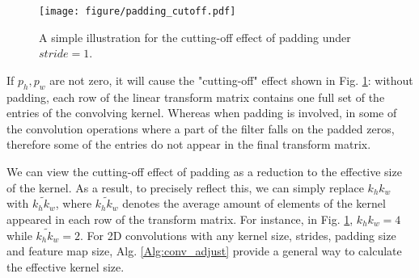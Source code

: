 \documentclass[10pt,journal,compsoc]{IEEEtran}
\begin{document}
\begin{figure}[ht]
\centering
\texttt{[image: figure/padding\_cutoff.pdf]}
\caption{A simple illustration for the cutting-off effect of padding under $stride=1$.}
\label{fig:padding_cutoff}
\end{figure}

If $p_h, p_w$ are not zero, it will cause the "cutting-off" effect shown in Fig. \ref{fig:padding_cutoff}: without padding, each row of the linear transform matrix contains one full set of the entries of the convolving kernel. Whereas when padding is involved, in some of the convolution operations where a part of the filter falls on the padded zeros, therefore some of the entries do not appear in the final transform matrix.

We can view the cutting-off effect of padding as a reduction to the effective size of the kernel. As a result, to precisely reflect this, we can simply replace $k_hk_w$ with $\widetilde{k_hk_w}$, where $\widetilde{k_hk_w}$ denotes the average amount of elements of the kernel appeared in each row of the transform matrix. For instance, in Fig. \ref{fig:padding_cutoff}, $k_hk_w=4$ while $\widetilde{k_hk_w}=2$. For 2D convolutions with any kernel size, strides, padding size and feature map size, Alg. \ref{Alg:conv_adjust} provide a general way to calculate the effective kernel size.
\end{document}

